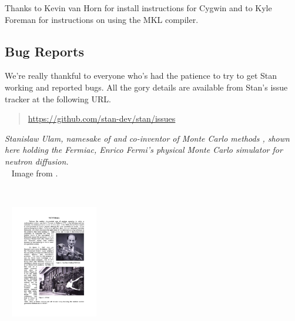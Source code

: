 Thanks to Kevin van Horn for install instructions for Cygwin and to
Kyle Foreman for instructions on using the MKL compiler.


\subsection*{Bug Reports}

We're really thankful to everyone who's had the patience to try
to get Stan working and reported bugs.  All the gory details are
available from Stan's issue tracker at the following URL.
%
\begin{quote}
\url{https://github.com/stan-dev/stan/issues}
\end{quote}




\vfill
\begin{center}
\hfill
\begin{minipage}[b]{2in}
  \footnotesize {\it Stanislaw Ulam, namesake of \Stan and co-inventor
    of Monte Carlo methods \citep{MetropolisUlam:1949}, shown here
    holding the Fermiac, Enrico Fermi's physical Monte Carlo simulator
    for neutron diffusion.}
  \\[3pt] \mbox{ } \hfill
  {\scriptsize Image from \citep{Giesler:2000}.}
\end{minipage} \ \ \ \ \ 
\begin{minipage}[b]{1.5in} \mbox{ } \hfill
  \includegraphics[width=1.5in]{img/ulam-fermiac.pdf}
\end{minipage} 
\end{center}
